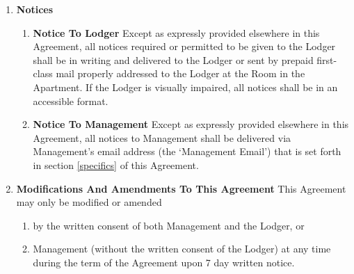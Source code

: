 \documentclass[12pt,letterpaper]{article}
\newcommand{\management}{Management}
\newcommand{\myemail}{Management Email}
\newcommand{\apt}{Apartment}
\newcommand{\room}{Room}
\newcommand{\lodger}{Lodger}
\begin{document}
\begin{enumerate}
\begin{enumerate}
			\item \textbf{Service Of Termination Notice} \label{service}
				\quad When a notice of termination requires service pursuant to California Code of Civil Procedure 1162, such service may be made by either: 
				\begin{enumerate}
					\item Personally delivering a copy to the \lodger{}; or, 
					\item If the \lodger{} is absent from the \room{} and from their usual place of business, service may be made by leaving a copy with some person of suitable age and discretion at their usual place of business, and sending a copy through the mail addressed to the \lodger{} at \apt{}; or, 
					\item If such place of business cannot be ascertained, or a person of suitable age or discretion there cannot be found, then service may be made by affixing a copy in a conspicuous place in the \room{}, and also sending a copy through the mail addressed to the \lodger{} at \apt{}.
				\end{enumerate}
		\end{enumerate}
	\item \textbf{Notices} \quad 
		\begin{enumerate} 
			\item \textbf{Notice To Lodger} \quad 
				Except as expressly provided elsewhere in this Agreement, all notices required or permitted to be given to the \lodger{} shall be in writing and delivered to the \lodger{} or sent by prepaid first-class mail properly addressed to the \lodger{} at the \room{} in the \apt{}. If the \lodger{} is visually impaired, all notices shall be in an accessible format. 
			\item \textbf{Notice To Management} \quad 
				Except as expressly provided elsewhere in this Agreement, all notices to \management{} shall be delivered via \management{}'s email address (the `\myemail{}') that is set forth in section \ref{specifics} of this Agreement{}.
		\end{enumerate}
	\item \textbf{Modifications And Amendments To This Agreement} \label{modifications}
		\quad This Agreement may only be modified or amended 
		\begin{enumerate}
			\item by the written consent of both \management{} and the \lodger{}, or 
			\item \management{} (without the written consent of the \lodger{}) at any time during the term of the Agreement upon 7 day written notice. 
		\end{enumerate}
				

\end{enumerate}
\end{document}
